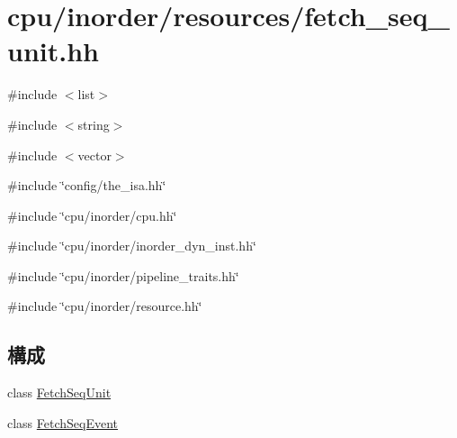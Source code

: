 \hypertarget{fetch__seq__unit_8hh}{
\section{cpu/inorder/resources/fetch\_\-seq\_\-unit.hh}
\label{fetch__seq__unit_8hh}
}
{\ttfamily \#include $<$list$>$}\par
{\ttfamily \#include $<$string$>$}\par
{\ttfamily \#include $<$vector$>$}\par
{\ttfamily \#include \char`\"{}config/the\_\-isa.hh\char`\"{}}\par
{\ttfamily \#include \char`\"{}cpu/inorder/cpu.hh\char`\"{}}\par
{\ttfamily \#include \char`\"{}cpu/inorder/inorder\_\-dyn\_\-inst.hh\char`\"{}}\par
{\ttfamily \#include \char`\"{}cpu/inorder/pipeline\_\-traits.hh\char`\"{}}\par
{\ttfamily \#include \char`\"{}cpu/inorder/resource.hh\char`\"{}}\par
\subsection*{構成}
\begin{DoxyCompactItemize}
\item 
class \hyperlink{classFetchSeqUnit}{FetchSeqUnit}
\item 
class \hyperlink{classFetchSeqUnit_1_1FetchSeqEvent}{FetchSeqEvent}
\end{DoxyCompactItemize}
